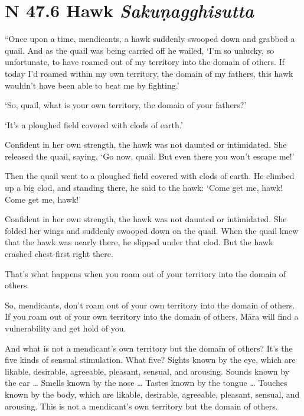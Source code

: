 \documentclass[12pt,openany]{book}%
\newcommand*{\suttatitleacronym}[1]{\smaller[2]{#1}\vspace*{.3em}}
\newcommand*{\suttatitletranslation}[1]{\linebreak{#1}}
\newcommand*{\suttatitleroot}[1]{\linebreak\smaller[2]\itshape{#1}}
\newcommand*{\tocacronym}[1]{\hspace*{-3.3em}{#1}\quad}
\newcommand*{\toctranslation}[1]{#1}
\newcommand*{\tocroot}[1]{(\textit{#1})}
\begin{document}
%
\section*{{\suttatitleacronym SN 47.6}{\suttatitletranslation A Hawk }{\suttatitleroot Sakuṇagghisutta}}
\addcontentsline{toc}{section}{\tocacronym{SN 47.6} \toctranslation{A Hawk } \tocroot{Sakuṇagghisutta}}

“Once upon a time, mendicants, a hawk suddenly swooped down and grabbed a quail. And as the quail was being carried off he wailed, ‘I’m so unlucky, so unfortunate, to have roamed out of my territory into the domain of others. If today I’d roamed within my own territory, the domain of my fathers, this hawk wouldn’t have been able to beat me by fighting.’ 

‘So, quail, what is your own territory, the domain of your fathers?’ 

‘It’s a ploughed field covered with clods of earth.’ 

Confident in her own strength, the hawk was not daunted or intimidated. She released the quail, saying, ‘Go now, quail. But even there you won’t escape me!’ 

Then the quail went to a ploughed field covered with clods of earth. He climbed up a big clod, and standing there, he said to the hawk: ‘Come get me, hawk! Come get me, hawk!’ 

Confident in her own strength, the hawk was not daunted or intimidated. She folded her wings and suddenly swooped down on the quail. When the quail knew that the hawk was nearly there, he slipped under that clod. But the hawk crashed chest-first right there. 

That’s what happens when you roam out of your territory into the domain of others. 

So, mendicants, don’t roam out of your own territory into the domain of others. If you roam out of your own territory into the domain of others, \textsanskrit{Māra} will find a vulnerability and get hold of you. 

And what is not a mendicant’s own territory but the domain of others? It’s the five kinds of sensual stimulation. What five? Sights known by the eye, which are likable, desirable, agreeable, pleasant, sensual, and arousing. Sounds known by the ear … Smells known by the nose … Tastes known by the tongue … Touches known by the body, which are likable, desirable, agreeable, pleasant, sensual, and arousing. This is not a mendicant’s own territory but the domain of others. 
\end{document}
